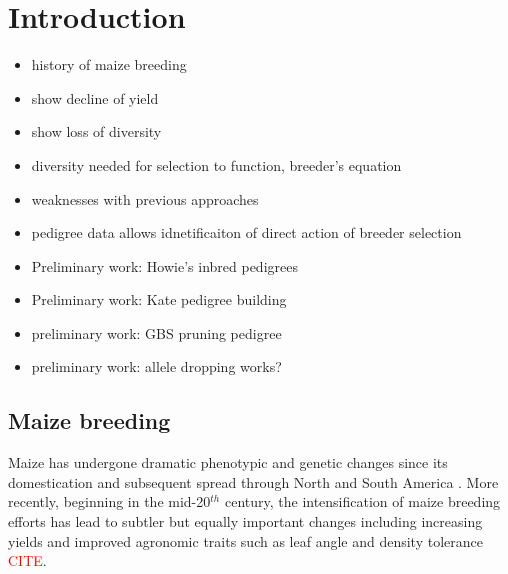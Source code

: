 \documentclass[12pt]{article}
\begin{document}
\section*{Introduction}
\label{sec:introduction}


\begin{itemize}
\item history of maize breeding
\item show decline of yield
\item show loss of diversity
\item diversity needed for selection to function, breeder's equation
\item weaknesses with previous approaches
\item pedigree data allows idnetificaiton of direct action of breeder selection
\item Preliminary work: Howie's inbred pedigrees
\item Preliminary work: Kate pedigree building
\item preliminary work: GBS pruning pedigree
\item preliminary work: allele dropping works?
\end{itemize}

\subsection*{Maize breeding}
Maize has undergone dramatic phenotypic and genetic changes since its domestication and subsequent spread through North and South America \citep{daFonseca:2015ey,Doebley:2004ce}. More recently, beginning in the mid-20$^{th}$ century, the intensification of maize breeding efforts has lead to subtler but equally important changes including increasing yields and improved agronomic traits such as leaf angle and density tolerance \textcolor{red}{CITE}. 
\end{document}
